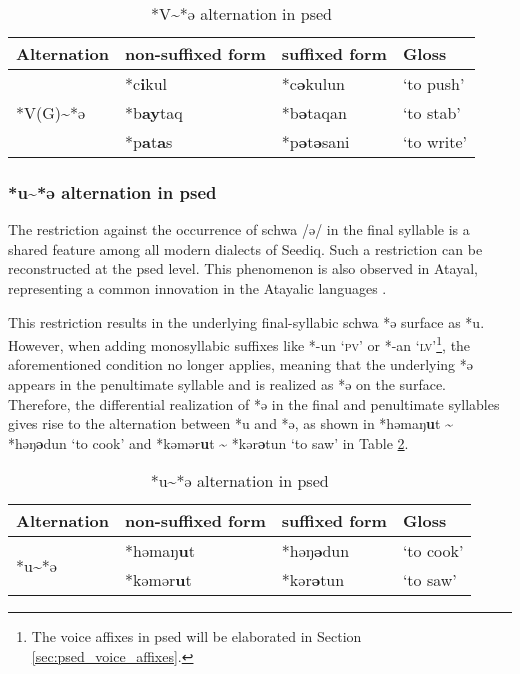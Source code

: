 \begin{table}[!htbp]
\centering
\caption{*V\~{}*ə alternation in \acl{psed}}
\label{tab:psed_V2ə}
\begin{tabular}{llll}
\hline
Alternation                   & non-suffixed form & suffixed form & Gloss     \\ \hline
\multirow{3}{*}{*V(G)\~{ }*ə} & *c\textbf{i}kul & *c\textbf{ə}kulun     & `to push' \\
                              & *b\textbf{ay}taq & *b\textbf{ə}taqan     & `to stab'   \\ 
                              & *p\textbf{a}t\textbf{a}s & *p\textbf{ə}t\textbf{ə}sani & `to write' \\ \hline
\end{tabular}
\end{table}

\subsubsection{*u\~{}*ə alternation in \acl{psed}}

The restriction against the occurrence of schwa /ə/ in the final syllable is a shared feature among all modern dialects of Seediq. Such a restriction can be reconstructed at the \acl{psed} level. This phenomenon is also observed in Atayal, representing a common innovation in the Atayalic languages \parencite{goderich2020phd, li1981paic}. 

This restriction results in the underlying final-syllabic schwa *ə surface as *u. However, when adding monosyllabic suffixes like *-un `\textsc{pv}' or *-an `\textsc{lv}'\footnote{The voice affixes in \acl{psed} will be elaborated in Section \ref{sec:psed_voice_affixes}.}, the aforementioned condition no longer applies, meaning that the underlying *ə appears in the penultimate syllable and is realized as *ə on the surface. Therefore, the differential realization of *ə in the final and penultimate syllables gives rise to the alternation between *u and *ə, as shown in *həmaŋ\textbf{u}t \~{} *həŋ\textbf{ə}dun `to cook' and *kəmər\textbf{u}t \~{} *kər\textbf{ə}tun `to saw' in Table \ref{tab:psed_ə2u}.

\begin{table}[!htbp]
\centering
\caption{*u\~{}*ə alternation in \acl{psed}}
\label{tab:psed_ə2u}
\begin{tabular}{llll}
\hline
Alternation               & non-suffixed form    & suffixed form & Gloss     \\ \hline
\multirow{2}{*}{*u\~{ }*ə} & *həmaŋ\textbf{u}t & *həŋ\textbf{ə}dun     & `to cook' \\
                          & *kəmər\textbf{u}t & *kər\textbf{ə}tun     & `to saw'   \\ \hline
\end{tabular}
\end{table}

